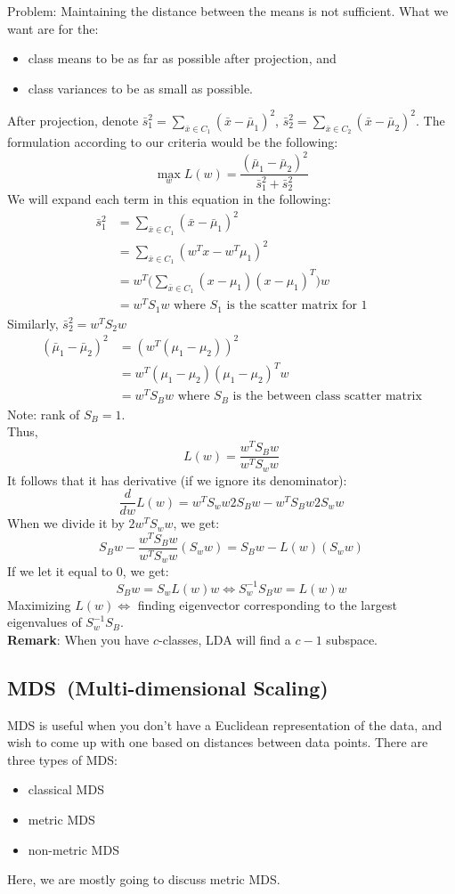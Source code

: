 \noindent Problem: Maintaining the distance between the means is not
sufficient. What we want are for the: 
\begin{itemize}
\item class means to be as far as possible after projection, and
\item class variances to be as small as possible.
\end{itemize}
After projection, denote $\bar{s}_1^2 = \sum_{\bar{x}\in C_1}
(\bar{x}-\bar{\mu}_1)^2$, $\bar{s}_2^2 = \sum_{\bar{x}\in C_2}
(\bar{x}-\bar{\mu}_2)^2$. The formulation according to our criteria
would be the following: 
\[
\max_{w} L(w)=\frac{(\bar{\mu}_1 - \bar{\mu}_2)^2}{\bar{s}_1^2+\bar{s}_2^2}
\]
We will expand each term in this equation in the following:\\
\begin{align*}
\bar{s}_1^2
&= \sum_{\bar{x}\in C_1} (\bar{x}-\bar{\mu}_1)^2\\
&= \sum_{\bar{x}\in C_1} (w^Tx-w^T\mu_1)^2\\
&= w^T\Big (\sum_{\bar{x}\in C_1} (x-\mu_1)(x-\mu_1)^T \Big ) w\\
&= w^TS_1w \textrm{ where } S_1 \textrm{ is the scatter matrix for }1
\end{align*}
Similarly, $\bar{s}_2^2=w^TS_2w$\\
\begin{align*}
(\bar{\mu}_1-\bar{\mu}_2)^2
&= (w^T (\mu_1 - \mu_2))^2\\
&= w^T(\mu_1-\mu_2)(\mu_1-\mu_2)^Tw\\
&= w^TS_Bw \textrm{ where } S_B \textrm{ is the between class scatter
    matrix} 
\end{align*}
Note: rank of $S_B = 1$.\\
Thus,
\[
L(w)=\frac{w^T S_B w}{w^T S_w w}
\]
It follows that it has derivative (if we ignore its denominator):
\[
\frac{d}{dw}L(w)=w^TS_w w2S_B w - w^T S_B w 2 S_w w
\]
When we divide it by $2w^TS_ww$, we get:
\[
S_Bw - \frac{w^T S_B w}{w^T S_w w} (S_w w)=S_Bw - L(w)(S_w w)
\]
If we let it equal to 0, we get:
\[
S_B w = S_w L(w) w \Leftrightarrow S_w^{-1} S_B w = L(w) w
\]
Maximizing $L(w) \Leftrightarrow$ finding eigenvector corresponding to
the largest eigenvalues of $S_w^{-1} S_B$.\\ 

\noindent \textbf{Remark}: When you have $c$-classes, LDA will find a
$c-1$ subspace. \\ 

\subsection{MDS~(Multi-dimensional Scaling)}
MDS is useful when you don't have a Euclidean representation of the
data, and wish to come up with one based on distances between data
points. There are three types of MDS: 
\begin{itemize}
\item classical MDS
\item metric MDS
\item non-metric MDS
\end{itemize}
Here, we are mostly going to discuss metric MDS.\\
